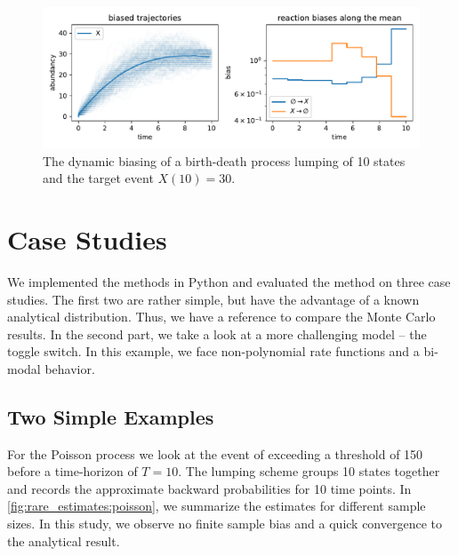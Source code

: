 \begin{figure}[htb]
    \centering
    \includegraphics[width=\textwidth]{gfx/bd_is.pdf}
    \caption[Dynamic biasing for the Poisson process]{\label{fig:bd_rare}The dynamic biasing of a birth-death process lumping of \num{10} states and the target event $X(10)=30$.}
\end{figure}
\section{Case Studies}
We implemented the methods in Python and evaluated the method on three case studies.
The first two are rather simple, but have the advantage of a known analytical distribution.
Thus, we have a reference to compare the Monte Carlo results.
In the second part, we take a look at a more challenging model -- the toggle switch.
In this example, we face non-polynomial rate functions and a bi-modal behavior.
\subsection{Two Simple Examples}
For the Poisson process we look at the event of exceeding a threshold of \num{150} before a time-horizon of $T=10$.
The lumping scheme groups \num{10} states together and records the approximate backward probabilities for \num{10} time points.
In \autoref{fig:rare_estimates:poisson}, we summarize the estimates for different sample sizes.
In this study, we observe no finite sample bias and a quick convergence to the analytical result.

